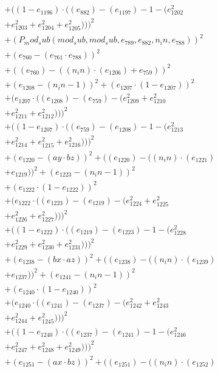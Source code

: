 \documentclass[10pt, a4paper]{article}
\begin{document}
\begin{align*}
& + ((1 - e_{1196})  \cdot  ((e_{882}) - (e_{1197}) - 1 - (e_{1202}^{2} \\
& + e_{1203}^{2} + e_{1204}^{2} + e_{1205}^{2})))^{2} \\
& + (P_mod_sub(mod_sub, mod_sub, e_{789}, e_{882}, n_in, e_{788}))^{2} \\
& + (e_{760} - (e_{761}  \cdot  e_{788}))^{2} \\
& + ((e_{760}) - ((n_in)  \cdot  (e_{1206}) + e_{759}))^{2} \\
& + (e_{1208} - (n_in - 1))^{2} + (e_{1207}  \cdot  (1 - e_{1207}))^{2} \\
& + (e_{1207}  \cdot  ((e_{1208}) - (e_{759}) - (e_{1209}^{2} + e_{1210}^{2} \\
& + e_{1211}^{2} + e_{1212}^{2})))^{2} \\
& + ((1 - e_{1207})  \cdot  ((e_{759}) - (e_{1208}) - 1 - (e_{1213}^{2} \\
& + e_{1214}^{2} + e_{1215}^{2} + e_{1216}^{2})))^{2} \\
& + (e_{1220} - (ay  \cdot  bz))^{2} + ((e_{1220}) - ((n_in)  \cdot  (e_{1221}) \\
& + e_{1219}))^{2} + (e_{1223} - (n_in - 1))^{2} \\
& + (e_{1222}  \cdot  (1 - e_{1222}))^{2} \\
& + (e_{1222}  \cdot  ((e_{1223}) - (e_{1219}) - (e_{1224}^{2} + e_{1225}^{2} \\
& + e_{1226}^{2} + e_{1227}^{2})))^{2} \\
& + ((1 - e_{1222})  \cdot  ((e_{1219}) - (e_{1223}) - 1 - (e_{1228}^{2} \\
& + e_{1229}^{2} + e_{1230}^{2} + e_{1231}^{2})))^{2} \\
& + (e_{1238} - (bx  \cdot  az))^{2} + ((e_{1238}) - ((n_in)  \cdot  (e_{1239}) \\
& + e_{1237}))^{2} + (e_{1241} - (n_in - 1))^{2} \\
& + (e_{1240}  \cdot  (1 - e_{1240}))^{2} \\
& + (e_{1240}  \cdot  ((e_{1241}) - (e_{1237}) - (e_{1242}^{2} + e_{1243}^{2} \\
& + e_{1244}^{2} + e_{1245}^{2})))^{2} \\
& + ((1 - e_{1240})  \cdot  ((e_{1237}) - (e_{1241}) - 1 - (e_{1246}^{2} \\
& + e_{1247}^{2} + e_{1248}^{2} + e_{1249}^{2})))^{2} \\
& + (e_{1251} - (ax  \cdot  bz))^{2} + ((e_{1251}) - ((n_in)  \cdot  (e_{1252}) \\

\end{align*}
\end{document}
